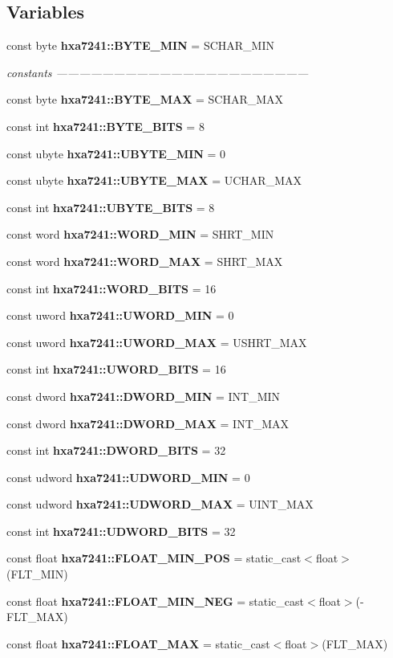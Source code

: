 \subsection*{Variables}
\begin{CompactItemize}
\item 
const byte {\bf hxa7241::BYTE\_\-MIN} = SCHAR\_\-MIN
\begin{CompactList}\small\item\em constants ------------------------------------------------------------------ \item\end{CompactList}\item 
const byte {\bf hxa7241::BYTE\_\-MAX} = SCHAR\_\-MAX
\item 
const int {\bf hxa7241::BYTE\_\-BITS} = 8
\item 
const ubyte {\bf hxa7241::UBYTE\_\-MIN} = 0
\item 
const ubyte {\bf hxa7241::UBYTE\_\-MAX} = UCHAR\_\-MAX
\item 
const int {\bf hxa7241::UBYTE\_\-BITS} = 8
\item 
const word {\bf hxa7241::WORD\_\-MIN} = SHRT\_\-MIN
\item 
const word {\bf hxa7241::WORD\_\-MAX} = SHRT\_\-MAX
\item 
const int {\bf hxa7241::WORD\_\-BITS} = 16
\item 
const uword {\bf hxa7241::UWORD\_\-MIN} = 0
\item 
const uword {\bf hxa7241::UWORD\_\-MAX} = USHRT\_\-MAX
\item 
const int {\bf hxa7241::UWORD\_\-BITS} = 16
\item 
const dword {\bf hxa7241::DWORD\_\-MIN} = INT\_\-MIN
\item 
const dword {\bf hxa7241::DWORD\_\-MAX} = INT\_\-MAX
\item 
const int {\bf hxa7241::DWORD\_\-BITS} = 32
\item 
const udword {\bf hxa7241::UDWORD\_\-MIN} = 0
\item 
const udword {\bf hxa7241::UDWORD\_\-MAX} = UINT\_\-MAX
\item 
const int {\bf hxa7241::UDWORD\_\-BITS} = 32
\item 
const float {\bf hxa7241::FLOAT\_\-MIN\_\-POS} = static\_\-cast$<$float$>$(FLT\_\-MIN)
\item 
const float {\bf hxa7241::FLOAT\_\-MIN\_\-NEG} = static\_\-cast$<$float$>$(-FLT\_\-MAX)
\item 
const float {\bf hxa7241::FLOAT\_\-MAX} = static\_\-cast$<$float$>$(FLT\_\-MAX)

\end{CompactItemize}
